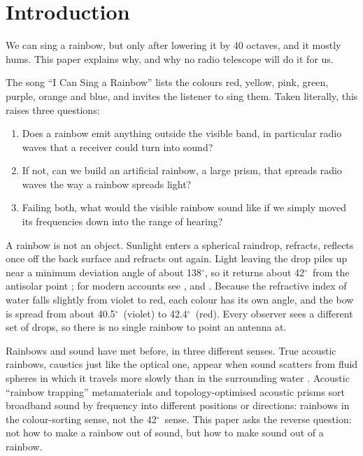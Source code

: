 \documentclass[11pt,a4paper]{article}
\newcommand{\dg}{\ensuremath{^\circ}}
\begin{document}
\section{Introduction}

We can sing a rainbow, but only after lowering it by 40 octaves, and it mostly hums. This paper explains why, and why no radio telescope will do it for us.

The song ``I Can Sing a Rainbow'' \citep{hamilton1955} lists the colours red, yellow, pink, green, purple, orange and blue, and invites the listener to sing them. Taken literally, this raises three questions:
\begin{enumerate}
  \item Does a rainbow emit anything outside the visible band, in particular radio waves that a receiver could turn into sound?
  \item If not, can we build an artificial rainbow, a large prism, that spreads radio waves the way a rainbow spreads light?
  \item Failing both, what would the visible rainbow sound like if we simply moved its frequencies down into the range of hearing?
\end{enumerate}

A rainbow is not an object. Sunlight enters a spherical raindrop, refracts, reflects once off the back surface and refracts out again. Light leaving the drop piles up near a minimum deviation angle of about 138\dg, so it returns about 42\dg\ from the antisolar point \citep{descartes1637}; for modern accounts see \citet{nussenzveig1977}, \citet{lee2001} and \citet{adam2002}. Because the refractive index of water falls slightly from violet to red, each colour has its own angle, and the bow is spread from about 40.5\dg\ (violet) to 42.4\dg\ (red). Every observer sees a different set of drops, so there is no single rainbow to point an antenna at.

Rainbows and sound have met before, in three different senses. True acoustic rainbows, caustics just like the optical one, appear when sound scatters from fluid spheres in which it travels more slowly than in the surrounding water \citep{marston1983}. Acoustic ``rainbow trapping'' metamaterials \citep{zhu2013} and topology-optimised acoustic prisms \citep{christiansen2025} sort broadband sound by frequency into different positions or directions: rainbows in the colour-sorting sense, not the 42\dg\ sense. This paper asks the reverse question: not how to make a rainbow out of sound, but how to make sound out of a rainbow.
\end{document}
